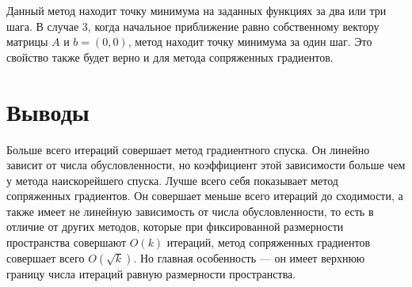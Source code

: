 \documentclass[english]{article}
\begin{document}
Данный метод находит точку минимума на заданных функциях за два или
три шага. В случае 3, когда начальное приближение равно собственному
вектору матрицы \(A\) и \(b = (0, 0)\), метод находит точку минимума
за один шаг. Это свойство также будет верно и для метода сопряженных
градиентов.

\section{Выводы}
Больше всего итераций совершает метод градиентного спуска. Он линейно
зависит от числа обусловленности, но коэффициент этой зависимости
больше чем у метода наискорейшего спуска. Лучше всего себя показывает
метод сопряженных градиентов. Он совершает меньше всего итераций до
сходимости, а также имеет не линейную зависимость от числа
обусловленности, то есть в отличие от других методов, которые при
фиксированной размерности пространства совершают \(O(k)\) итераций,
метод сопряженных градиентов совершает всего \(O(\sqrt{k})\). Но
главная особенность --- он имеет верхнюю границу числа итераций равную
размерности пространства.
\end{document}
